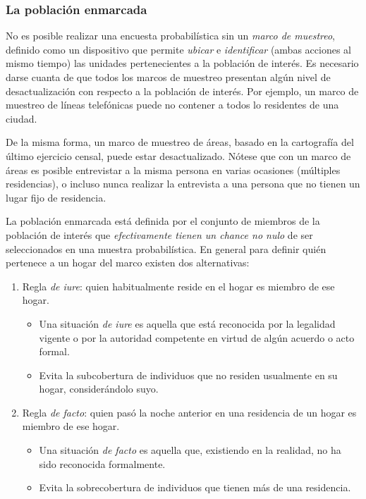 \documentclass[
  10pt,
  spanish,
]{book}
\providecommand{\tightlist}{%
  \setlength{\itemsep}{0pt}\setlength{\parskip}{0pt}}
\begin{document}
\hypertarget{la-poblaciuxf3n-enmarcada}{%
\subsubsection*{La población enmarcada}\label{la-poblaciuxf3n-enmarcada}}

No es posible realizar una encuesta probabilística sin un \emph{marco de muestreo}, definido como un dispositivo que permite \emph{ubicar} e \emph{identificar} (ambas acciones al mismo tiempo) las unidades pertenecientes a la población de interés. Es necesario darse cuanta de que todos los marcos de muestreo presentan algún nivel de desactualización con respecto a la población de interés. Por ejemplo, un marco de muestreo de líneas telefónicas puede no contener a todos lo residentes de una ciudad.

De la misma forma, un marco de muestreo de áreas, basado en la cartografía del último ejercicio censal, puede estar desactualizado. Nótese que con un marco de áreas es posible entrevistar a la misma persona en varias ocasiones (múltiples residencias), o incluso nunca realizar la entrevista a una persona que no tienen un lugar fijo de residencia.

La población enmarcada está definida por el conjunto de miembros de la población de interés que \emph{efectivamente tienen un chance no nulo} de ser seleccionados en una muestra probabilística. En general para definir quién pertenece a un hogar del marco existen dos alternativas:

\begin{enumerate}
\def\labelenumi{\arabic{enumi}.}
\tightlist
\item
  Regla \emph{de iure}: quien habitualmente reside en el hogar es miembro de ese hogar.

  \begin{itemize}
  \tightlist
  \item
    Una situación \emph{de iure} es aquella que está reconocida por la legalidad vigente o por la autoridad competente en virtud de algún acuerdo o acto formal.
  \item
    Evita la subcobertura de individuos que no residen usualmente en su hogar, considerándolo suyo.
  \end{itemize}
\item
  Regla \emph{de facto}: quien pasó la noche anterior en una residencia de un hogar es miembro de ese hogar.

  \begin{itemize}
  \tightlist
  \item
    Una situación \emph{de facto} es aquella que, existiendo en la realidad, no ha sido reconocida formalmente.
  \item
    Evita la sobrecobertura de individuos que tienen más de una residencia.
  \end{itemize}
\end{enumerate}
\end{document}
